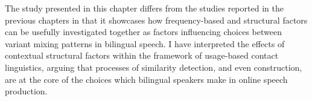The study presented in this chapter differs from the studies reported in the previous chapters in that it showcases how frequency-based and structural factors can be usefully investigated together as factors influencing choices between variant mixing patterns in bilingual speech. I have interpreted the effects of contextual structural factors within the framework of usage-based contact linguistics, arguing that processes of similarity detection, and even construction, are at the core of the choices which bilingual speakers make in online speech production.
